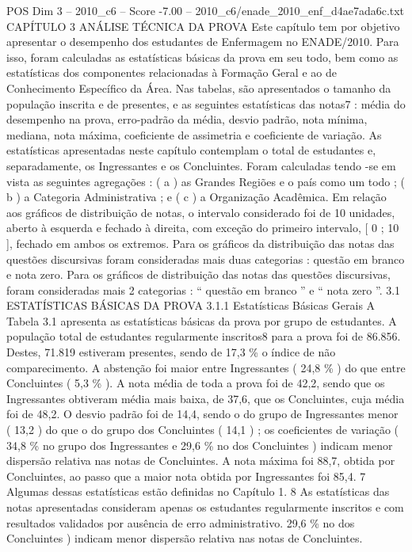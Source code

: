 \begin{textsample}{POS Dim 3 – 2010\_c6 – Score -7.00 – 2010\_c6/enade\_2010\_enf\_d4ae7ada6c.txt}  \label{ex:f3_pos_269}
CAPÍTULO 3 ANÁLISE TÉCNICA DA PROVA Este capítulo tem por objetivo apresentar o desempenho dos estudantes de Enfermagem no ENADE/2010.
Para isso, foram calculadas as estatísticas básicas da prova em seu todo, bem como as estatísticas dos componentes relacionadas à Formação Geral e ao de Conhecimento Específico da Área.
Nas tabelas, são apresentados o tamanho da população inscrita e de presentes, e as seguintes estatísticas das notas7 : média do desempenho na prova, erro-padrão da média, desvio padrão, nota mínima, mediana, nota máxima, coeficiente de assimetria e coeficiente de variação.
As estatísticas apresentadas neste capítulo contemplam o total de estudantes e, separadamente, os Ingressantes e os Concluintes.
Foram calculadas tendo -se em vista as seguintes agregações : ( a ) as Grandes Regiões e o país como um todo ; ( b ) a Categoria Administrativa ; e ( c ) a Organização Acadêmica.
Em relação aos gráficos de distribuição de notas, o intervalo considerado foi de 10 unidades, aberto à esquerda e fechado à direita, com exceção do primeiro intervalo, [ 0 ; 10 ], fechado em ambos os extremos.
Para os gráficos da distribuição das notas das questões discursivas foram consideradas mais duas categorias : questão em branco e nota zero.
Para os gráficos de distribuição das notas das questões discursivas, foram consideradas mais 2 categorias : “ questão em branco ” e “ nota zero ”. 3.1 ESTATÍSTICAS BÁSICAS DA PROVA 3.1.1 Estatísticas Básicas Gerais A Tabela 3.1 apresenta as estatísticas básicas da prova por grupo de estudantes.
A população total de estudantes regularmente inscritos8 para a prova foi de 86.856.
Destes, 71.819 estiveram presentes, sendo de 17,3 \% o índice de não comparecimento.
A abstenção foi maior entre Ingressantes ( 24,8 \% ) do que entre Concluintes ( 5,3 \% ).
A nota média de toda a prova foi de 42,2, sendo que os Ingressantes obtiveram média mais baixa, de 37,6, que os Concluintes, cuja média foi de 48,2.
O desvio padrão foi de 14,4, sendo o do grupo de Ingressantes menor ( 13,2 ) do que o do grupo dos Concluintes ( 14,1 ) ; os coeficientes de variação ( 34,8 \% no grupo dos Ingressantes e 29,6 \% no dos Concluintes ) indicam menor dispersão relativa nas notas de Concluintes.
A nota máxima foi 88,7, obtida por Concluintes, ao passo que a maior nota obtida por Ingressantes foi 85,4. 7 Algumas dessas estatísticas estão definidas no Capítulo 1. 8 As estatísticas das notas apresentadas consideram apenas os estudantes regularmente inscritos e com resultados validados por ausência de erro administrativo. 29,6 \% no dos Concluintes ) indicam menor dispersão relativa nas notas de Concluintes.

\end{textsample}
